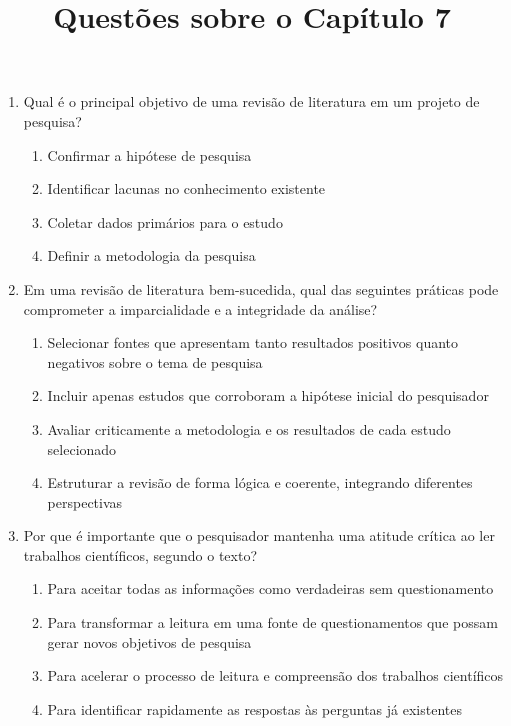 \documentclass{article}
\begin{document}
\title{ Questões sobre o Capítulo 7}
\author{}
\date{}
\maketitle

\begin{enumerate}

\item Qual é o principal objetivo de uma revisão de literatura em um projeto de pesquisa?
\begin{enumerate}
    \item Confirmar a hipótese de pesquisa
    \item Identificar lacunas no conhecimento existente
    \item Coletar dados primários para o estudo
    \item Definir a metodologia da pesquisa
\end{enumerate}

\item Em uma revisão de literatura bem-sucedida, qual das seguintes práticas pode comprometer a imparcialidade e a integridade da análise?
\begin{enumerate}
\item Selecionar fontes que apresentam tanto resultados positivos quanto negativos sobre o tema de pesquisa
\item Incluir apenas estudos que corroboram a hipótese inicial do pesquisador
\item Avaliar criticamente a metodologia e os resultados de cada estudo selecionado
\item Estruturar a revisão de forma lógica e coerente, integrando diferentes perspectivas
\end{enumerate}

\item Por que é importante que o pesquisador mantenha uma atitude crítica ao ler trabalhos científicos, segundo o texto?
\begin{enumerate}
\item Para aceitar todas as informações como verdadeiras sem questionamento
\item Para transformar a leitura em uma fonte de questionamentos que possam gerar novos objetivos de pesquisa
\item Para acelerar o processo de leitura e compreensão dos trabalhos científicos
\item Para identificar rapidamente as respostas às perguntas já existentes
\end{enumerate}


\end{enumerate}
\end{document}
